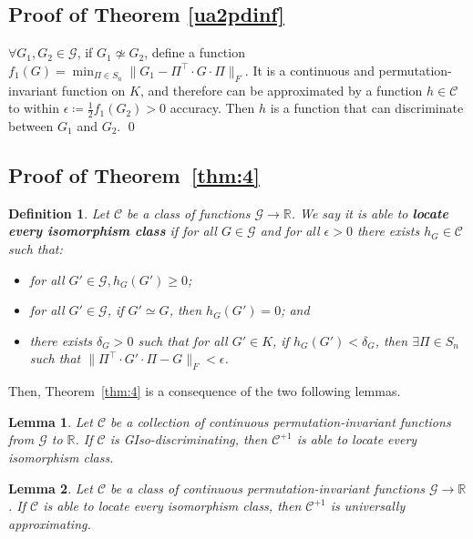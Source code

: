 \documentclass{article}
\newtheorem{lemma}{Lemma}
\newtheorem{definition}{Definition}
\def\Gfun{\mathcal{G}}
\begin{document}
\subsection{Proof of Theorem \ref{ua2pdinf}}
\label{app:pf_thm3}
$\forall G_1, G_2 \in \Gfun$, if $G_1 \not\simeq G_2$, define a function $f_1(G) = \min_{\Pi \in S_n} \| G_1 - \Pi^\intercal \cdot G \cdot \Pi \|_{F}$. It is a continuous and permutation-invariant function on $K$, and therefore can be approximated by a function $h \in \mathcal{C}$ to within $\epsilon \coloneqq \frac{1}{2}f_1(G_2) > 0$ accuracy. Then $h$ is a function that can discriminate between $G_1$ and $G_2$. \qed

\subsection{Proof of Theorem~\ref{thm:4}}
\label{app:pf_thm4}
\begin{definition}
\label{locate}
Let $\mathcal{C}$ be a class of functions $\Gfun \to \mathbb{R}$. We say it is able to \textbf{locate every isomorphism class} if for all $G \in \Gfun$ and for all $\epsilon > 0$ there exists $h_G \in \mathcal{C}$ such that:
\begin{itemize}
    \item for all $G' \in \Gfun, h_G(G') \geq 0$;
    \item for all $G' \in \Gfun$, if $G' \simeq G$, then $h_G(G') = 0$; and
    \item there exists $\delta_G > 0$ such that for all $G' \in K$, if $h_G(G') < \delta_G$, then $\exists \Pi \in S_n$ such that $\| \Pi^\intercal \cdot G' \cdot \Pi - G \|_F < \epsilon$.
\end{itemize}
\end{definition}

Then, Theorem~\ref{thm:4} is a consequence of the two following lemmas.
\begin{lemma} \label{lemma.C+1}
Let $\mathcal{C}$ be a collection of continuous permutation-invariant functions from $\Gfun$ to $\mathbb{R}$. If $\mathcal{C}$ is GIso-discriminating, then $\mathcal{C}^{+1}$ is able to locate every isomorphism class.
\end{lemma}

\begin{lemma} \label{lemma.locate.approx}
Let $\mathcal{C}$ be a class of continuous permutation-invariant functions $\Gfun \to \mathbb{R}$. 
If $\mathcal{C}$ is able to locate every isomorphism class, then $\mathcal{C}^{+1}$ is universally approximating.
\end{lemma}
\end{document}
